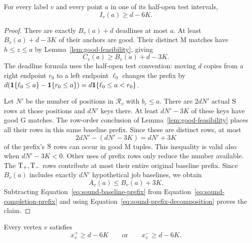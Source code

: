 \begin{lemma}\label{lem:coverage}
For every label \(v\) and every point \(a\) in one of its half-open
test intervals,
\begin{equation}\label{eq:sound-test-coverage}
 I_v(a)\ge d-6K.
\end{equation}
\end{lemma}

\begin{proof}
There are exactly \(B_v(a)+d\) deadlines at most \(a\).
At least \(B_v(a)+d-3K\) of their anchors are good.
Their distinct \(\mathrm M\) matches have \(h\le z\le a\) by
Lemma~\ref{lem:good-feasibility}, giving
\begin{equation}\label{eq:sound-completion-prefix}
 C_v(a)\ge B_v(a)+d-3K.
\end{equation}
The deadline formula uses the half-open test convention: moving
\(d\) copies from a right endpoint \(r_0\) to a left endpoint
\(\ell_0\) changes the prefix by
\(d(\mathbf{1}\{\ell_0\le a\}-\mathbf{1}\{r_0\le a\})
=d\mathbf{1}\{\ell_0\le a<r_0\}\).

Let \(N'\) be the number of positions in \(\mathcal R_v\) with
\(b_r\le a\).  There are \(2dN'\) actual \(\mathrm{S}\) rows at those
positions and \(dN'\) keys there.  At least \(dN'-3K\) of these keys
have good \(\mathrm G\) matches.  The row-order conclusion of
Lemma~\ref{lem:good-feasibility} places all their rows in this same
baseline prefix.  Since these are distinct rows, at most
\[
 2dN'-(dN'-3K)=dN'+3K
\]
of the prefix's \(\mathrm{S}\) rows can occur in good \(\mathrm M\)
tuples.  This inequality is valid also when \(dN'-3K<0\).
Other uses of prefix rows only reduce the number available.
The \(\mathrm{T}_{+},\mathrm{T}_{-}\) rows contribute at most their entire original
baseline prefix.  Since \(B_v(a)\) includes exactly \(dN'\)
hypothetical job baselines, we obtain
\begin{equation}\label{eq:sound-baseline-prefix}
 A_v(a)\le B_v(a)+3K.
\end{equation}
Subtracting Equation~\eqref{eq:sound-baseline-prefix} from
Equation~\eqref{eq:sound-completion-prefix} and using
Equation~\eqref{eq:sound-prefix-decomposition} proves the claim.
\end{proof}

\begin{lemma}\label{lem:side-choice}
Every vertex \(v\) satisfies
\begin{equation}\label{eq:sound-side-choice}
 x_v^+\ge d-6K\qquad\text{or}\qquad x_v^-\ge d-6K.
\end{equation}
\end{lemma}

